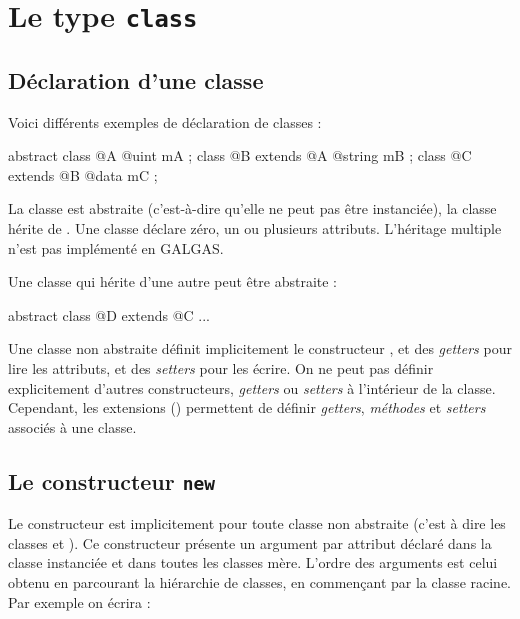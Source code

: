 
\chapter{Le type \texttt{class}}

\section{Déclaration d'une classe}

Voici différents exemples de déclaration de classes :

\begin{galgascode}
abstract class @A {
  @uint mA ;
}
class @B extends @A {
  @string mB ;
}
class @C extends @B {
  @data mC ;
}
\end{galgascode}

La classe  est abstraite (c'est-à-dire qu'elle ne peut pas être instanciée), la classe  hérite de . Une classe déclare zéro, un ou plusieurs attributs. L'héritage multiple n'est pas implémenté en GALGAS.

Une classe qui hérite d'une autre peut être abstraite :
\begin{galgascode}
abstract class @D extends @C {
  ...
 }
\end{galgascode}

Une classe non abstraite définit implicitement le constructeur , et des \emph{getters} pour lire les attributs, et des \emph{setters} pour les écrire. On ne peut pas définir explicitement d'autres constructeurs, \emph{getters} ou \emph{setters} à l'intérieur de la classe. Cependant,  les extensions () permettent de définir \emph{getters}, \emph{méthodes} et \emph{setters} associés à une classe.












\section{Le constructeur \texttt{new}}

Le constructeur  est implicitement pour toute classe non abstraite (c'est à dire les classes  et ). Ce constructeur présente un argument par attribut déclaré dans la classe instanciée et dans toutes les classes mère. L'ordre des arguments est celui obtenu en parcourant la hiérarchie de classes, en commençant par la classe racine. Par exemple on écrira :

